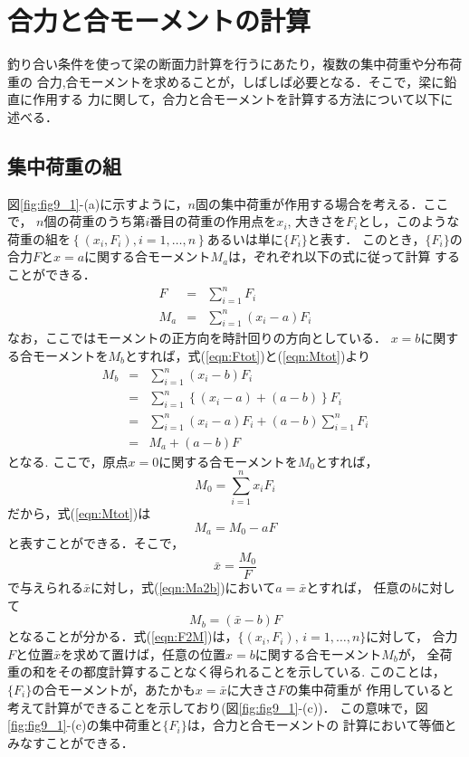 \documentclass[10pt,a4j]{jarticle}
\begin{document}
\section{合力と合モーメントの計算}
釣り合い条件を使って梁の断面力計算を行うにあたり，複数の集中荷重や分布荷重の
合力,合モーメントを求めることが，しばしば必要となる．そこで，梁に鉛直に作用する
力に関して，合力と合モーメントを計算する方法について以下に述べる．
\subsection{集中荷重の組}
図\ref{fig:fig9_1}-(a)に示すように，$n$固の集中荷重が作用する場合を考える．ここで，
$n$個の荷重のうち第$i$番目の荷重の作用点を$x_i$, 大きさを$F_i$とし，このような
荷重の組を$\left\{ \left(x_i, F_i\right), i=1,\dots ,n\right\}$あるいは単に$\{F_i\}$と表す．
このとき，$\{F_i\}$の合力$F$と$x=a$に関する合モーメント$M_a$は，ぞれぞれ以下の式に従って計算
することができる．
\begin{eqnarray}
	F &=& \sum_{i=1}^n F_i 
	\label{eqn:Ftot}
	\\
	M_a &=& \sum_{i=1}^n (x_i-a)F_i 
	\label{eqn:Mtot}
\end{eqnarray}
なお，ここではモーメントの正方向を時計回りの方向としている．
$x=b$に関する合モーメントを$M_b$とすれば，式(\ref{eqn:Ftot})と(\ref{eqn:Mtot})より
\begin{eqnarray}
	M_b &=& \sum_{i=1}^n (x_i-b)F_i  \nonumber \\
	    &=& \sum_{i=1}^n \left\{ (x_i-a)+(a-b)\right\}F_i  \nonumber \\
	    &=& \sum_{i=1}^n (x_i-a)F_i +(a-b)\sum_{i=1}^n F_i  \nonumber \\
	    &=& M_a +(a-b)F 
	\label{eqn:Ma2b}
\end{eqnarray}
となる. ここで，原点$x=0$に関する合モーメントを$M_0$とすれば，
\begin{equation}
	M_0= \sum_{i=1}^n x_i F_i 
	\label{eqn:M0}
\end{equation}
だから，式(\ref{eqn:Mtot})は
\begin{equation}
	M_a = M_0 -aF 
	\label{eqn:}
\end{equation}
と表すことができる．そこで，
\begin{equation}
	\bar{x} = \frac{M_0}{F}
	\label{eqn:xbar}
\end{equation}
で与えられる$\bar x$に対し，式(\ref{eqn:Ma2b})において$a=\bar x$とすれば，
任意の$b$に対して
\begin{equation}
	M_b= \left( \bar x - b\right) F
	\label{eqn:F2M}
\end{equation}
となることが分かる．式(\ref{eqn:F2M})は，$\{ (x_i, F_i),\, i=1,\dots ,n\}$に対して，
合力$F$と位置$\bar x$を求めて置けば，任意の位置$x=b$に関する合モーメント$M_b$が，
全荷重の和をその都度計算することなく得られることを示している.
このことは，$\{F_i\}$の合モーメントが，あたかも$x=\bar x$に大きさ$F$の集中荷重が
作用していると考えて計算ができることを示しており(図\ref{fig:fig9_1}-(c))．
この意味で，図\ref{fig:fig9_1}-(c)の集中荷重と$\{ F_i\}$は，合力と合モーメントの
計算において等価とみなすことができる．
\end{document}
